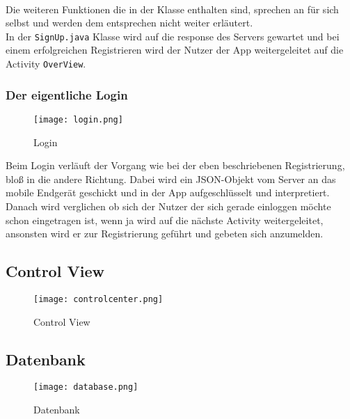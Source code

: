 \\
Die weiteren Funktionen die in der Klasse enthalten sind, sprechen an für sich selbst und werden dem entsprechen nicht weiter erläutert.
\\
In der \texttt{SignUp.java} Klasse wird auf die response des Servers gewartet und bei einem erfolgreichen Registrieren wird der Nutzer der App weitergeleitet auf die Activity \texttt{OverView}.

 
\subsubsection{Der eigentliche Login}
\begin{figure}[h]
  \begin{center}
    \texttt{[image: login.png]}
  		  \caption{Login}
     \label{fig.Prozess}
  \end{center}
\end{figure}

Beim Login verläuft der Vorgang wie bei der eben beschriebenen Registrierung, bloß in die andere Richtung. Dabei wird ein JSON-Objekt vom Server an das mobile Endgerät geschickt und in der App aufgeschlüsselt und interpretiert. Danach wird verglichen ob sich der Nutzer der sich gerade einloggen möchte schon eingetragen ist, wenn ja wird auf die nächste Activity weitergeleitet, ansonsten wird er zur Registrierung geführt und gebeten sich anzumelden.
\subsection{Control View}
\begin{figure}[h]
  \begin{center}
    \texttt{[image: controlcenter.png]}
  		  \caption{Control View}
     \label{fig.Prozess}
  \end{center}
\end{figure}
\subsection{Datenbank}
\begin{figure}[h]
  \begin{center}
    \texttt{[image: database.png]}
  		  \caption{Datenbank}
     \label{fig.Prozess}
  \end{center}
\end{figure}